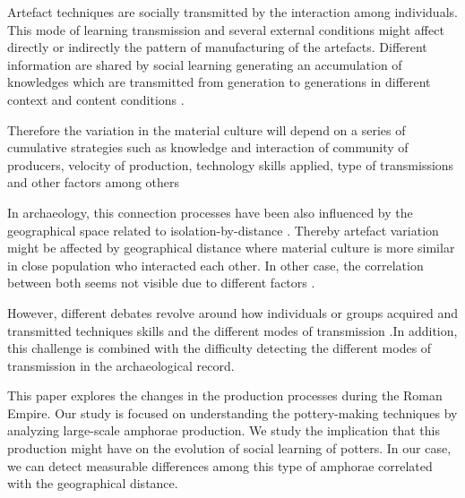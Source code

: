 \documentclass[review]{elsarticle}
\begin{document}
Artefact techniques are socially transmitted by the interaction among individuals.
This mode of learning transmission and several external conditions might affect directly or indirectly the pattern of manufacturing of the artefacts. Different information are shared by social learning generating an accumulation of knowledges which are transmitted from generation to generations in different context and content conditions  \citep{eerkens_jelmer_cultural_2005, neff1992ceramics,henrich_evolution_2003, boyd_cultural_2011}. 

Therefore the variation in the material culture will depend on a series of cumulative strategies such as knowledge and interaction of community of producers, velocity of production, technology skills applied, type of transmissions and other factors among others %

In archaeology, this connection processes have been also influenced by the geographical space related to isolation-by-distance \citep{bjorklund_effect_2010,shennan_isolation-by-distance_2015, van_strien_isolation-by-distance_2015}. Thereby artefact variation might be affected by geographical distance where material culture is more similar in close population who interacted each other. In other case, the correlation between both seems not visible due to different factors \citep{hart_effects_2012}. 

However, different debates revolve around how individuals or groups acquired and transmitted techniques skills and the different modes of transmission   \citep{bowser_learning_2008, mesoudi_cultural_2008, roux_standardization_2015}.In  addition, this challenge is combined with the difficulty detecting the different modes of transmission in the archaeological record.     



                              

This paper explores the changes in the production processes during the Roman Empire. Our study is focused on understanding the pottery-making techniques by analyzing large-scale amphorae production. We study the implication that this production might have on the evolution of social learning of potters. In our case, we can detect measurable differences among this type of amphorae correlated with the geographical distance. 
\end{document}
